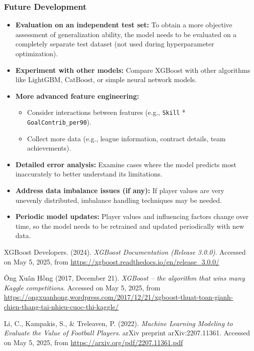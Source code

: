 \documentclass[12pt, a4paper]{report}
\begin{document}
\subsubsection*{Future Development}
\begin{itemize}
    \item \textbf{Evaluation on an independent test set:} To obtain a more objective assessment of generalization ability, the model needs to be evaluated on a completely separate test dataset (not used during hyperparameter optimization).
    \item \textbf{Experiment with other models:} Compare XGBoost with other algorithms like LightGBM, CatBoost, or simple neural network models.
    \item \textbf{More advanced feature engineering:}
    \begin{itemize}
        \item Consider interactions between features (e.g., \texttt{Skill} * \texttt{GoalContrib\_per90}).
        \item Collect more data (e.g., league information, contract details, team achievements).
    \end{itemize}
    \item \textbf{Detailed error analysis:} Examine cases where the model predicts most inaccurately to better understand its limitations.
    \item \textbf{Address data imbalance issues (if any):} If player values are very unevenly distributed, imbalance handling techniques may be needed.
    \item \textbf{Periodic model updates:} Player values and influencing factors change over time, so the model needs to be retrained and updated periodically with new data.
\end{itemize}


\begin{thebibliography}{99}
XGBoost Developers. (2024). \textit{XGBoost Documentation (Release 3.0.0)}.
Accessed on May 5, 2025, from \url{https://xgboost.readthedocs.io/en/release_3.0.0/}

Ông Xuân Hồng (2017, December 21). \textit{XGBoost – the algorithm that wins many Kaggle competitions}.
Accessed on May 5, 2025, from \url{https://ongxuanhong.wordpress.com/2017/12/21/xgboost-thuat-toan-gianh-chien-thang-tai-nhieu-cuoc-thi-kaggle/}

Li, C., Kampakis, S., \& Treleaven, P. (2022). \textit{Machine Learning Modeling to Evaluate the Value of Football Players}.
arXiv preprint arXiv:2207.11361. Accessed on May 5, 2025, from \url{https://arxiv.org/pdf/2207.11361.pdf}

\end{thebibliography}
\end{document}
